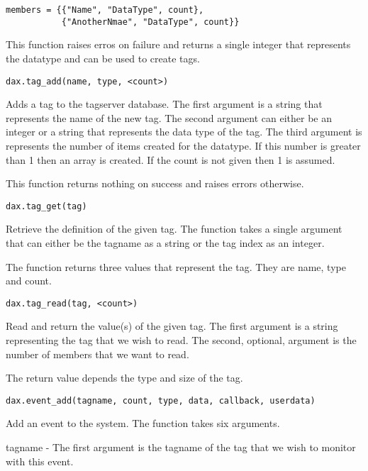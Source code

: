 \begin{verbatim}
members = {{"Name", "DataType", count},
           {"AnotherNmae", "DataType", count}}
\end{verbatim}

This function raises erros on failure and returns a single integer that represents the datatype and can be used to create tags.

\begin{verbatim}
dax.tag_add(name, type, <count>)
\end{verbatim}

Adds a tag to the tagserver database.  The first argument is a string that represents the name of the new tag.  The second argument can either be an integer or a string that represents the data type of the tag.  The third argument is represents the number of items created for the datatype.  If this number is greater than 1 then an array is created.  If the count is not given then 1 is assumed.

This function returns nothing on success and raises errors otherwise.

\begin{verbatim}
dax.tag_get(tag)
\end{verbatim}
Retrieve the definition of the given tag.  The function takes a single argument that can either be the tagname as a string or the tag index as an integer.

The function returns three values that represent the tag.  They are name, type and count.

\begin{verbatim}
dax.tag_read(tag, <count>)
\end{verbatim}
Read and return the value(s) of the given tag.  The first argument is a string representing the tag that we wish to read.  The second, optional, argument is the number of members that we want to read.

The return value depends the type and size of the tag.

\begin{verbatim}
dax.event_add(tagname, count, type, data, callback, userdata)
\end{verbatim}
Add an event to the system.  The function takes six arguments.

tagname - The first argument is the tagname of the tag that we wish to monitor with this event.

